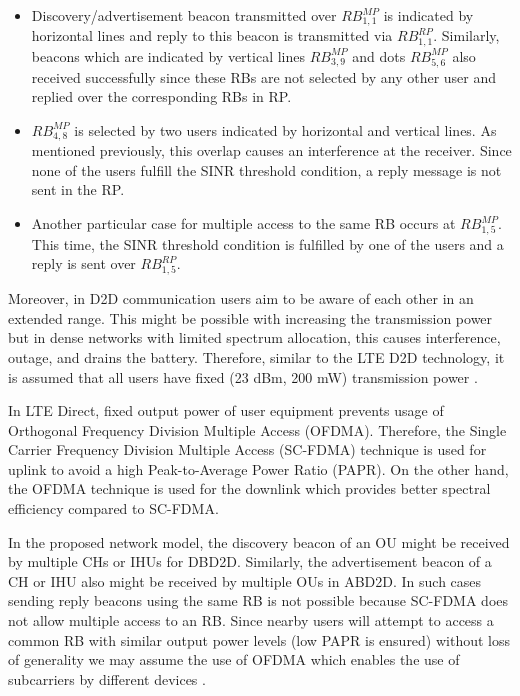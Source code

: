 \documentclass[10pt,a4paper,twocolumn]{article}
\begin{document}
\begin{itemize}
	\item  Discovery/advertisement beacon transmitted over $RB^{MP}_{1,1}$ is indicated by horizontal lines and reply to this beacon is transmitted via $RB^{RP}_{1,1}$. Similarly, beacons which are indicated by vertical lines $RB^{MP}_{3,9}$ and dots $RB^{MP}_{5,6}$ also received successfully since these RBs are not selected by any other user and replied over the corresponding RBs in RP. 
	\item $RB^{MP}_{4,8}$ is selected by two users indicated by horizontal and vertical lines. As mentioned previously, this overlap causes an interference at the receiver. Since none of the users fulfill the SINR threshold condition, a reply message is not sent in the RP.
	\item Another particular case for multiple access to the same RB occurs at $RB^{MP}_{1,5}$. This time, the SINR threshold condition is fulfilled by one of the users and a reply is sent over $RB^{RP}_{1,5}$.
\end{itemize}

Moreover, in D2D communication users aim to be aware of each other in an extended range. This might be possible with increasing the transmission power but in dense networks with limited spectrum allocation, this causes interference, outage, and drains the battery. Therefore, similar to the LTE D2D technology, it is assumed that all users have fixed (23 dBm, 200 mW) transmission power \cite{36877}.

In LTE Direct, fixed output power of user equipment prevents usage of Orthogonal Frequency Division Multiple Access (OFDMA). Therefore, the Single Carrier Frequency Division Multiple Access (SC-FDMA) technique is used for uplink to avoid a high Peak-to-Average Power Ratio (PAPR). On the other hand, the OFDMA technique is used for the downlink which provides better spectral efficiency compared to SC-FDMA.

In the proposed network model, the discovery beacon of an OU might be received by multiple CHs or IHUs for DBD2D. Similarly, the advertisement beacon of a CH or IHU also might be received by multiple OUs in ABD2D. In such cases sending reply beacons using the same RB is not possible because SC-FDMA does not allow multiple access to an RB. Since nearby users will attempt to access a common RB with similar output power levels (low PAPR is ensured) without loss of generality we may assume the use of OFDMA which enables the use of subcarriers by different devices \cite{BerardinelliOFDMAvsSCFDMA}. 
\end{document}
